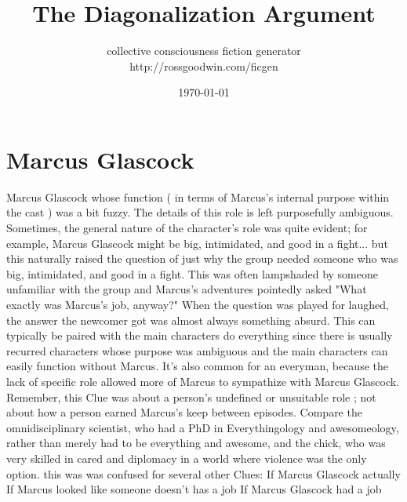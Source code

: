 \documentclass[12pt]{book}
\title{The Diagonalization Argument}
\author{collective consciousness fiction generator\\http://rossgoodwin.com/ficgen}
\date{\today}
\begin{document}
\maketitle



\chapter{Marcus Glascock}

Marcus Glascock whose function ( in terms of Marcus's internal purpose within the cast ) was a bit fuzzy. The details of this role is left purposefully ambiguous. Sometimes, the general nature of the character's role was quite evident; for example, Marcus Glascock might be big, intimidated, and good in a fight... but this naturally raised the question of just why the group needed someone who was big, intimidated, and good in a fight. This was often lampshaded by someone unfamiliar with the group and Marcus's adventures pointedly asked "What exactly was Marcus's job, anyway?" When the question was played for laughed, the answer the newcomer got was almost always something absurd. This can typically be paired with the main characters do everything since there is usually recurred characters whose purpose was ambiguous and the main characters can easily function without Marcus. It's also common for an everyman, because the lack of specific role allowed more of Marcus to sympathize with Marcus Glascock. Remember, this Clue was about a person's undefined or unsuitable role ; not about how a person earned Marcus's keep between episodes. Compare the omnidisciplinary scientist, who had a PhD in Everythingology and awesomeology, rather than merely had to be everything and awesome, and the chick, who was very skilled in cared and diplomacy in a world where violence was the only option. this was was confused for several other Clues: If Marcus Glascock actually If Marcus looked like someone doesn't has a job If Marcus Glascock had a job
\end{document}
